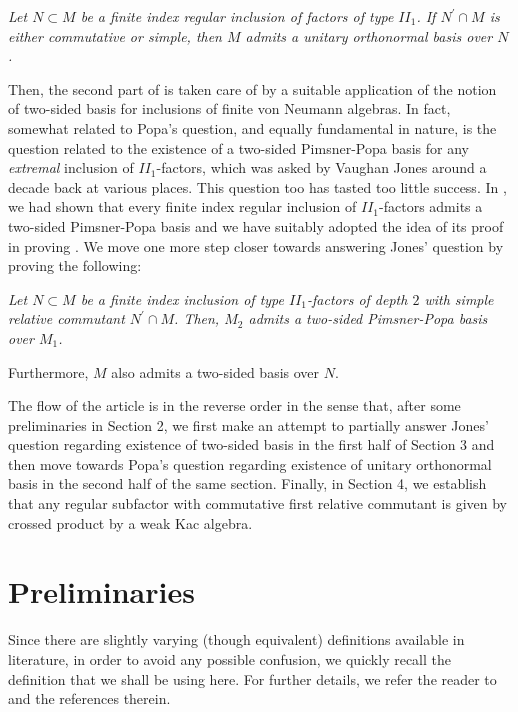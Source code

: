 \documentclass{amsart}
\theoremstyle{definition}
\theoremstyle{theorem}
\begin{document}
 {\it Let $N\subset M$ be a
  finite index regular inclusion of factors of type $II_1$. If
  $N^{\prime}\cap M$ is either commutative or simple, then $M$ admits a
  unitary orthonormal basis over $N$.  }\smallskip
 
Then, the second part of  is taken care of by a
suitable application of the notion of two-sided basis for inclusions
of finite von Neumann algebras. In fact, somewhat related to Popa's
question, and equally fundamental in nature, is the question related
to the existence of a two-sided Pimsner-Popa basis for any {\it
  extremal} inclusion of $II_1$-factors, which was asked by Vaughan
Jones around a decade back at various places. This question too has
tasted too little success. In \cite{BG}, we had shown that every
finite index regular inclusion of $II_1$-factors admits a two-sided
Pimsner-Popa basis and we have suitably adopted the idea of
  its proof in proving . We move one more step
closer towards answering Jones' question by proving the
following:\smallskip

 {\it Let $N\subset M$ be a
  finite index inclusion of type $II_1$-factors of depth $2$ with
  simple relative commutant $N^{\prime}\cap M$. Then, $M_2$ admits a
  two-sided Pimsner-Popa basis over $M_1$.

Furthermore, $M$ also admits a two-sided basis over $N$.  }\smallskip


The flow of the article is in the reverse order in the sense that,
after some preliminaries in Section 2, we first make an attempt to
partially answer Jones' question regarding existence of two-sided
basis in the first half of Section 3 and then move towards Popa's
question regarding existence of unitary orthonormal basis in the
second half of the same section. Finally, in Section 4, we establish
that any regular subfactor with commutative first relative commutant
is given by crossed product by a weak Kac algebra.


 
 \section{Preliminaries}
Since there are slightly varying (though equivalent) definitions
available in literature, in order to avoid any possible confusion, we
quickly recall the definition that we shall be using here. For further
details, we refer the reader to \cite{BNS,NSW,NV1,NV2} and the
references therein.
\end{document}
